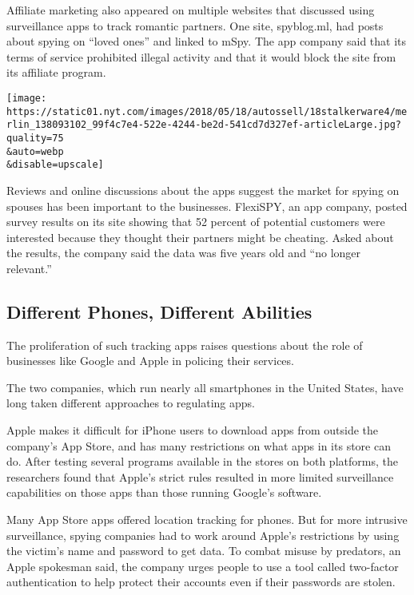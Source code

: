 Affiliate marketing also appeared on multiple websites that discussed
using surveillance apps to track romantic partners. One site,
spyblog.ml, had posts about spying on ``loved ones'' and linked to mSpy.
The app company said that its terms of service prohibited illegal
activity and that it would block the site from its affiliate program.

\texttt{[image: https://static01.nyt.com/images/2018/05/18/autossell/18stalkerware4/merlin\_138093102\_99f4c7e4-522e-4244-be2d-541cd7d327ef-articleLarge.jpg?quality=75\\\&auto=webp\\\&disable=upscale]}

Reviews and online discussions about the apps suggest the market for
spying on spouses has been important to the businesses. FlexiSPY, an app
company, posted survey results on its site showing that 52 percent of
potential customers were interested because they thought their partners
might be cheating. Asked about the results, the company said the data
was five years old and ``no longer relevant.''

\hypertarget{different-phones-different-abilities}{%
\subsection{Different Phones, Different
Abilities}\label{different-phones-different-abilities}}

The proliferation of such tracking apps raises questions about the role
of businesses like Google and Apple in policing their services.

The two companies, which run nearly all smartphones in the United
States, have long taken different approaches to regulating apps.

Apple makes it difficult for iPhone users to download apps from outside
the company's App Store, and has many restrictions on what apps in its
store can do. After testing several programs available in the stores on
both platforms, the researchers found that Apple's strict rules resulted
in more limited surveillance capabilities on those apps than those
running Google's software.

Many App Store apps offered location tracking for phones. But for more
intrusive surveillance, spying companies had to work around Apple's
restrictions by using the victim's name and password to get data. To
combat misuse by predators, an Apple spokesman said, the company urges
people to use a tool called two-factor authentication to help protect
their accounts even if their passwords are stolen.

